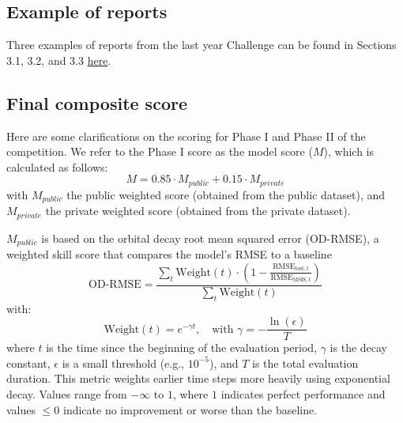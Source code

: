 \documentclass[11pt,a4paper]{storm-ai_report}
\begin{document}
\subsection{Example of reports}
Three examples of reports from the last year Challenge can be found in Sections 3.1, 3.2, and 3.3 \href{https://www.researchgate.net/publication/383978701_Satellite_Pattern-of-Life_Identification_Challenge_Competition_Design_and_Results}{here}.

\subsection{Final composite score}
Here are some clarifications on the scoring for Phase I and Phase II of the competition. We refer to the Phase I score as the model score ($M$), which is calculated as follows:
\begin{equation}
M = 0.85 \cdot M_{public} + 0.15 \cdot M_{private}
\end{equation}
with $M_{public}$ the public weighted score (obtained from the public dataset), and $M_{private}$ the private weighted score (obtained from the private dataset). 

$M_{public}$ is based on the orbital decay root mean squared error (OD-RMSE), a weighted skill score that compares the model's RMSE to a baseline
\begin{equation}
\text{OD-RMSE} = \frac{\sum_t \text{Weight}(t) \cdot \left(1 - \frac{\text{RMSE}_{\text{test}, t}}{\text{RMSE}_{\text{MSIS}, t}}\right)}{\sum_t \text{Weight}(t)}
\end{equation}
with:
\begin{equation}
\text{Weight}(t) = e^{-\gamma t}, \quad \text{with } \gamma = -\frac{\ln(\epsilon)}{T}
\end{equation}
where $t$ is the time since the beginning of the evaluation period, $\gamma$ is the decay constant, $\epsilon$ is a small threshold (e.g., $10^{-5}$), and $T$ is the total evaluation duration. This metric weights earlier time steps more heavily using exponential decay. Values range from $-\infty$ to $1$, where $1$ indicates perfect performance and values $\leq 0$ indicate no improvement or worse than the baseline.
\end{document}
